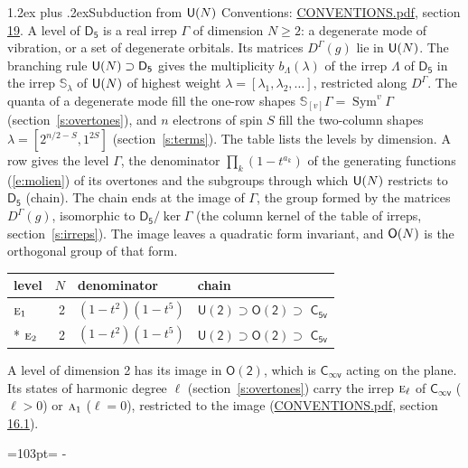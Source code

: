 \documentclass[10pt,a4paper]{article}
\makeatletter
\renewcommand\section{\@startsection{section}{1}{\z@}{-3ex plus -1ex minus -.2ex}%
  {1.2ex plus .2ex}{\normalfont\large\sffamily\bfseries\color{parttitle}}}
\newcommand{\needspace}[1]{\par\penalty-100\begingroup\dimen0=#1\relax\dimen2=\pagegoal
  \advance\dimen2-\pagetotal\ifdim\dimen0>\dimen2\relax\ifdim\dimen2>0pt\vfil\break\fi\fi
  \endgroup}
\numberwithin{equation}{section}
\newcommand{\grp}[1]{\mathsf{#1}}
\newcommand{\irr}[1]{\text{\normalfont\scshape #1}}
\newcommand{\repD}[1]{D^{#1}}
\newcommand{\schur}[1]{\mathbb{S}_{#1}}
\newcommand{\shape}[1]{[#1]}
\makeatother
\begin{document}
\section{Subduction from \texorpdfstring{$\grp{U(\mathnormal{N})}$}{U(N)}}\label{s:unitary}
Conventions: \href{../../CONVENTIONS.pdf}{CONVENTIONS.pdf}, section \href{../../CONVENTIONS.pdf\#conv.19}{19}.
\leavevmode\label{n:local.level.dimension}A level of $\grp{D_{5}}$ is a real irrep $\Gamma$ of dimension $N \ge 2$: a degenerate mode of vibration, or a set of degenerate orbitals. \label{n:group.unitary}Its matrices $\repD{\Gamma}(g)$ lie in $\grp{U(\mathnormal{N})}$. \label{n:irrep.schur}\label{n:shape.partition}\label{n:local.partition}\label{n:function.multiplicity.unitary}The branching rule $\grp{U(\mathnormal{N})} \supset \grp{D_{5}}$ gives the multiplicity $b_\Lambda(\lambda)$ of the irrep $\Lambda$ of $\grp{D_{5}}$ in the irrep $\schur{\lambda}$ of $\grp{U(\mathnormal{N})}$ of highest weight $\lambda = \shape{\lambda_1, \lambda_2, \dots}$, restricted along $\repD{\Gamma}$. \label{n:local.partition.power}\label{n:local.electrons}\label{n:local.spin}The quanta of a degenerate mode fill the one-row shapes $\schur{\shape{v}}\Gamma = \operatorname{Sym}^{v}\Gamma$ (section~\ref{s:overtones}), and $n$ electrons of spin $S$ fill the two-column shapes $\lambda = \shape{2^{n/2-S}, 1^{2S}}$ (section~\ref{s:terms}).
The table lists the levels by dimension. \label{n:head.level}\label{n:head.denominator}\label{n:index.overtone.denominator}\label{n:head.chain}A row gives the level $\Gamma$, the denominator $\prod_k (1 - t^{a_k})$ of the generating functions (\ref{e:molien}) of its overtones and the subgroups through which $\grp{U(\mathnormal{N})}$ restricts to $\grp{D_{5}}$ (chain). The chain ends at the image of $\Gamma$, the group formed by the matrices $\repD{\Gamma}(g)$, isomorphic to $\grp{D_{5}}/\ker\Gamma$ (the column kernel of the table of irreps, section~\ref{s:irreps}). The image leaves a quadratic form invariant, and $\grp{O(\mathnormal{N})}$ is the orthogonal group of that form.
{\small\begin{longtable}{@{}lrll@{}}\toprule
level & $N$ & denominator & chain\\\midrule\endhead
\bottomrule\endfoot\endlastfoot
$\irr{e}_{1}$ & 2 & $(1-t^{2})(1-t^{5})$ & $\grp{U(2)} \supset \grp{O(2)} \supset$ \href{C5v.pdf}{$\grp{C_{5v}}$}\\*
$\irr{e}_{2}$ & 2 & $(1-t^{2})(1-t^{5})$ & $\grp{U(2)} \supset \grp{O(2)} \supset$ \href{C5v.pdf}{$\grp{C_{5v}}$}\\
\bottomrule\end{longtable}}
A level of dimension 2 has its image in $\grp{O(2)}$, which is \href{Cinfv.pdf}{$\grp{C_{\infty v}}$} acting on the plane. \label{n:index.harmonic.degree}Its states of harmonic degree $\ell$ (section~\ref{s:overtones}) carry the irrep $\irr{e}_{\ell}$ of \href{Cinfv.pdf}{$\grp{C_{\infty v}}$} ($\ell > 0$) or $\irr{a}_{1}$ ($\ell = 0$), restricted to the image (\href{../../CONVENTIONS.pdf}{CONVENTIONS.pdf}, section \href{../../CONVENTIONS.pdf\#conv.16.1}{16.1}).
\needspace{103pt}
\end{document}
